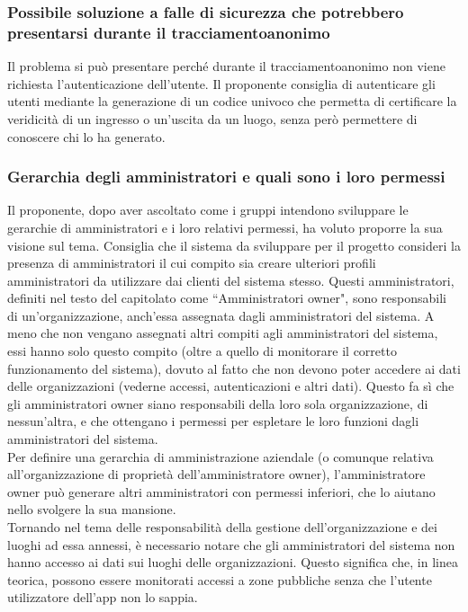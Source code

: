 \subsubsection*{Possibile soluzione a falle di sicurezza che potrebbero presentarsi durante il tracciamentoanonimo}
Il problema si può presentare perché durante il tracciamentoanonimo non viene richiesta l'autenticazione dell'utente.
Il proponente consiglia di autenticare gli utenti mediante la generazione di un codice univoco che permetta di certificare la veridicità di un ingresso o un'uscita da un luogo, senza però permettere di conoscere chi lo ha generato.

\subsubsection*{Gerarchia degli amministratori e quali sono i loro permessi}
Il proponente, dopo aver ascoltato come i gruppi intendono sviluppare le gerarchie di amministratori e i loro relativi permessi, ha voluto proporre la sua visione sul tema.
Consiglia che il sistema da sviluppare per il progetto consideri la presenza di amministratori il cui compito sia creare ulteriori profili amministratori da utilizzare
dai clienti del sistema stesso. Questi amministratori, definiti nel testo del capitolato come ``Amministratori owner", sono responsabili di un'organizzazione, anch'essa assegnata dagli amministratori del sistema.
A meno che non vengano assegnati altri compiti agli amministratori del sistema, essi hanno solo questo compito (oltre a quello di monitorare il corretto funzionamento del sistema), dovuto al fatto che non devono poter accedere ai dati delle organizzazioni (vederne accessi, autenticazioni e altri dati).
Questo fa sì che gli amministratori owner siano responsabili della loro sola organizzazione, di nessun'altra, e che ottengano i permessi per espletare le loro funzioni dagli amministratori del sistema.\\
Per definire una gerarchia di amministrazione aziendale (o comunque relativa all'organizzazione di proprietà dell'amministratore owner), l'amministratore owner può generare altri amministratori con permessi inferiori, che lo aiutano nello svolgere la sua mansione.\\
Tornando nel tema delle responsabilità della gestione dell'organizzazione e dei luoghi ad essa annessi, è necessario notare che gli amministratori del sistema non hanno accesso ai dati sui luoghi delle organizzazioni.
Questo significa che, in linea teorica, possono essere monitorati accessi a zone pubbliche senza che l'utente utilizzatore dell'app non lo sappia.

